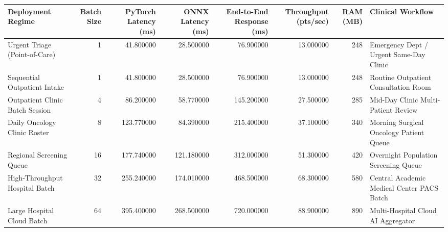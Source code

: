 \begin{tabular}{lrrrrrrl}
\toprule
Deployment Regime & Batch Size & PyTorch Latency (ms) & ONNX Latency (ms) & End-to-End Response (ms) & Throughput (pts/sec) & RAM (MB) & Clinical Workflow \\
\midrule
Urgent Triage (Point-of-Care) & 1 & 41.800000 & 28.500000 & 76.900000 & 13.000000 & 248 & Emergency Dept / Urgent Same-Day Clinic \\
Sequential Outpatient Intake & 1 & 41.800000 & 28.500000 & 76.900000 & 13.000000 & 248 & Routine Outpatient Consultation Room \\
Outpatient Clinic Batch Session & 4 & 86.200000 & 58.770000 & 145.200000 & 27.500000 & 285 & Mid-Day Clinic Multi-Patient Review \\
Daily Oncology Clinic Roster & 8 & 123.770000 & 84.390000 & 215.400000 & 37.100000 & 340 & Morning Surgical Oncology Patient Queue \\
Regional Screening Queue & 16 & 177.740000 & 121.180000 & 312.000000 & 51.300000 & 420 & Overnight Population Screening Queue \\
High-Throughput Hospital Batch & 32 & 255.240000 & 174.010000 & 468.500000 & 68.300000 & 580 & Central Academic Medical Center PACS Batch \\
Large Hospital Cloud Batch & 64 & 395.400000 & 268.500000 & 720.000000 & 88.900000 & 890 & Multi-Hospital Cloud AI Aggregator \\
\bottomrule
\end{tabular}
